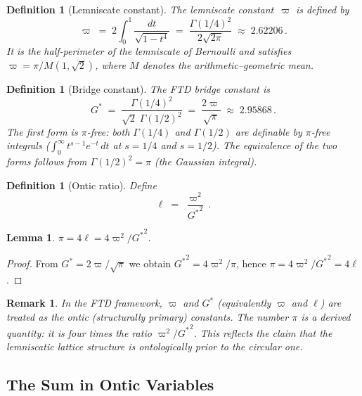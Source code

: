 \documentclass[12pt]{article}
\newtheorem{lemma}[theorem]{Lemma}
\newtheorem{definition}[theorem]{Definition}
\newtheorem{remark}[theorem]{Remark}
\begin{document}
\begin{definition}[Lemniscate constant]\label{def:varpi}
The lemniscate constant~$\varpi$ is defined by
\[
\varpi \;=\; 2\int_0^1\frac{dt}{\sqrt{1-t^4}}
\;=\;\frac{\Gamma(1/4)^2}{2\sqrt{2\pi}}
\;\approx\;2.62206\,.
\]
It is the half-perimeter of the lemniscate of Bernoulli and satisfies
$\varpi=\pi/M(1,\sqrt{2})$, where $M$ denotes the arithmetic--geometric mean.
\end{definition}

\begin{definition}[Bridge constant]\label{def:Gstar}
The FTD bridge constant is
\[
{G^{*}} \;=\; \frac{\Gamma(1/4)^2}{\sqrt{2}\;\Gamma(1/2)^2} \;=\; \frac{2\varpi}{\sqrt{\pi}} \;\approx\; 2.95868\,.
\]
The first form is $\pi$-free: both $\Gamma(1/4)$ and $\Gamma(1/2)$ are definable by $\pi$-free integrals ($\int_0^\infty t^{s-1}e^{-t}\,dt$ at $s = 1/4$ and $s = 1/2$). The equivalence of the two forms follows from $\Gamma(1/2)^2 = \pi$ (the Gaussian integral).
\end{definition}

\begin{definition}[Ontic ratio]\label{def:ell}
Define
\begin{equation}\label{eq:ell}
\ell \;=\; \frac{\varpi^2}{{G^{*}}^2}\,.
\end{equation}
\end{definition}

\begin{lemma}\label{lem:pi}
$\pi = 4\ell = 4\varpi^2/{G^{*}}^2$.
\end{lemma}
\begin{proof}
From ${G^{*}}=2\varpi/\sqrt{\pi}$ we obtain ${G^{*}}^2=4\varpi^2/\pi$,
hence $\pi=4\varpi^2/{G^{*}}^2=4\ell$.
\end{proof}

\begin{remark}\label{rem:ontic-priority}
In the FTD framework, $\varpi$ and ${G^{*}}$ (equivalently $\varpi$ and
$\ell$) are treated as the ontic (structurally primary) constants.
The number $\pi$ is a derived quantity: it is four times the ratio
$\varpi^2/{G^{*}}^2$.  This reflects the claim that the lemniscatic lattice
structure is ontologically prior to the circular one.
\end{remark}

\subsection{The Sum in Ontic Variables}
\end{document}
